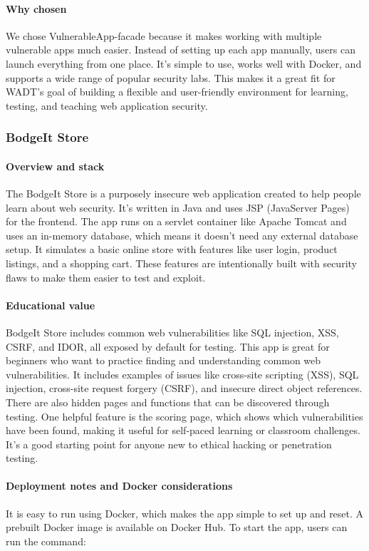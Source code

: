 \documentclass[12pt,titlepage]{article}
\begin{document}
\paragraph{Why chosen}
We chose VulnerableApp-facade because it makes working with multiple vulnerable apps much easier. Instead of setting up each app manually, users can launch everything from one place. It’s simple to use, works well with Docker, and supports a wide range of popular security labs. This makes it a great fit for WADT’s goal of building a flexible and user-friendly environment for learning, testing, and teaching web application security.

\subsubsection{BodgeIt Store}

\paragraph{Overview and stack}
The BodgeIt Store is a purposely insecure web application created to help people learn about web security. It’s written in Java and uses JSP (JavaServer Pages) for the frontend. The app runs on a servlet container like Apache Tomcat and uses an in-memory database, which means it doesn’t need any external database setup. It simulates a basic online store with features like user login, product listings, and a shopping cart. These features are intentionally built with security flaws to make them easier to test and exploit.

\paragraph{Educational value}
BodgeIt Store includes common web vulnerabilities like SQL injection, XSS, CSRF, and IDOR, all exposed by default for testing. This app is great for beginners who want to practice finding and understanding common web vulnerabilities. It includes examples of issues like cross-site scripting (XSS), SQL injection, cross-site request forgery (CSRF), and insecure direct object references. There are also hidden pages and functions that can be discovered through testing. One helpful feature is the scoring page, which shows which vulnerabilities have been found, making it useful for self-paced learning or classroom challenges. It’s a good starting point for anyone new to ethical hacking or penetration testing.

\paragraph{Deployment notes and Docker considerations}
It is easy to run using Docker, which makes the app simple to set up and reset. A prebuilt Docker image is available on Docker Hub. To start the app, users can run the command:
\end{document}
